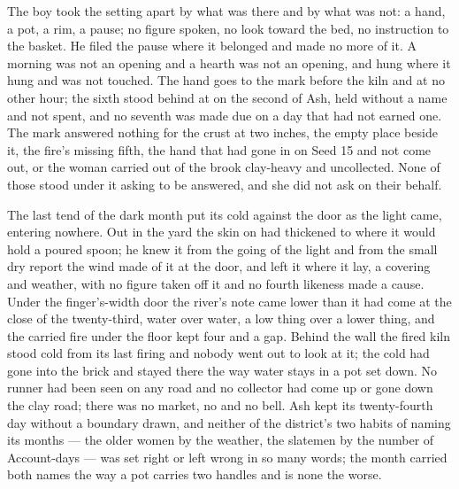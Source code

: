 The boy took the setting apart by what was there and by what was not: a hand, a pot, a rim, a pause; no figure spoken, no look toward the bed, no instruction to the basket. He filed the pause where it belonged and made no more of it. A morning was not an opening and a hearth was not an opening, and  hung where it hung and was not touched. The hand goes to the mark before the kiln and at no other hour; the sixth stood behind at  on the second of Ash, held without a name and not spent, and no seventh was made due on a day that had not earned one. The mark answered nothing for the crust at two inches, the empty place beside it, the fire's missing fifth, the hand that had gone in on Seed 15 and not come out, or the woman carried out of the brook clay-heavy and uncollected. None of those stood under it asking to be answered, and she did not ask on their behalf.

The last tend of the dark month put its cold against the door as the light came, entering nowhere. Out in the yard the skin on  had thickened to where it would hold a poured spoon; he knew it from the going of the light and from the small dry report the wind made of it at the door, and left it where it lay, a covering and weather, with no figure taken off it and no fourth likeness made a cause. Under the finger's-width door the river's note came lower than it had come at the close of the twenty-third, water over water, a low thing over a lower thing, and the carried fire under the floor kept four and a gap. Behind the wall the fired kiln stood cold from its last firing and nobody went out to look at it; the cold had gone into the brick and stayed there the way water stays in a pot set down. No runner had been seen on any road and no collector had come up or gone down the clay road; there was no market, no  and no bell. Ash kept its twenty-fourth day without a boundary drawn, and neither of the district's two habits of naming its months --- the older women by the weather, the slatemen by the number of Account-days --- was set right or left wrong in so many words; the month carried both names the way a pot carries two handles and is none the worse.

\scenebreak

